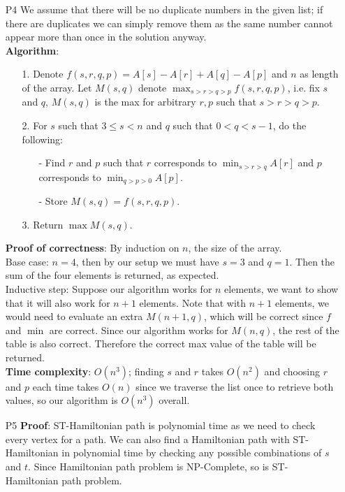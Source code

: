\documentclass{article}
\begin{document}
\newpage
\begin{itemize}
    \item [P4] We assume that there will be no duplicate numbers in the given list; if there are duplicates we can simply remove them as the same number cannot appear more than once in the solution anyway.\\
          \textbf{Algorithm}:
          \begin{itemize}
              \item [1.] Denote $f(s,r,q,p)=A[s]-A[r]+A[q]-A[p]$ and $n$ as length of the array. Let $M(s,q)$ denote $\max_{s>r>q>p}f(s,r,q,p)$, i.e. fix $s$ and $q$, $M(s,q)$ is the max for arbitrary $r,p$ such that $s>r>q>p$.
              \item [2.] For $s$ such that $3\leq s<n$ and $q$ such that $0<q<s-1$, do the following:
                    \begin{itemize}
                        \item [-] Find $r$ and $p$ such that $r$ corresponds to $\min_{s>r>q}A[r]$ and $p$ corresponds to $\min_{q>p>0}A[p]$.
                        \item [-] Store $M(s,q)=f(s,r,q,p)$.
                    \end{itemize}
              \item [3.] Return $\max M(s,q)$.
          \end{itemize}
          \textbf{Proof of correctness}: By induction on $n$, the size of the array.\\
          Base case: $n=4$, then by our setup we must have $s=3$ and $q=1$. Then the sum of the four elements is returned, as expected.\\
          Inductive step: Suppose our algorithm works for $n$ elements, we want to show that it will also work for $n+1$ elements. Note that with $n+1$ elements, we would need to evaluate an extra $M(n+1,q)$, which will be correct since $f$ and $\min$ are correct. Since our algorithm works for $M(n,q)$, the rest of the table is also correct. Therefore the correct max value of the table will be returned.\\
          \textbf{Time complexity}: $O(n^3)$; finding $s$ and $r$ takes $O(n^2)$ and choosing $r$ and $p$ each time takes $O(n)$ since we traverse the list once to retrieve both values, so our algorithm is $O(n^3)$ overall.
\end{itemize}

\newpage
\begin{itemize}
    \item [P5] \textbf{Proof}: ST-Hamiltonian path is polynomial time as we need to check every vertex for a path. We can also find a Hamiltonian path with ST-Hamiltonian in polynomial time by checking any possible combinations of $s$ and $t$. Since Hamiltonian path problem is NP-Complete, so is ST-Hamiltonian path problem.
\end{itemize}
\end{document}
